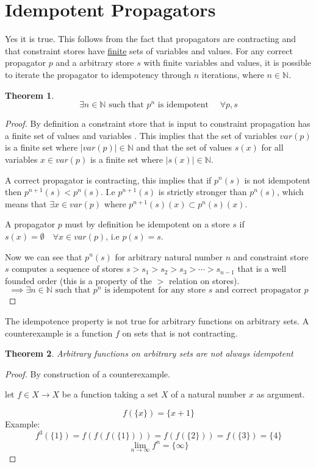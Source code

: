 \documentclass[a4paper, 11pt]{article}
\newtheorem{theorem}{Theorem}[section]
\begin{document}
\section*{Idempotent Propagators}
Yes it is true. This follows from the fact that propagators are contracting and that constraint stores have \underline{finite} sets of variables and values. For any correct propagator $p$ and a arbitrary store $s$ with finite variables and values, it is possible to iterate the propagator to idempotency through $n$ iterations, where $n \in \mathbb{N}$.

\begin{theorem}
  $$\exists n \in \mathbb{N} \text{ such that } p^n \text{ is idempotent } \quad \forall p,s$$
\end{theorem}
\begin{proof}
By definition a constraint store that is input to constraint propagation has a finite set of values and variables \citep{schulte_notes}. This implies that the set of variables $var(p)$ is a finite set where $|var(p)| \in \mathbb{N}$ and that the set of values $s(x)$ for all variables $x \in var(p)$ is a finite set where $|s(x)| \in \mathbb{N}$.

A correct propagator is contracting, this implies that if $p^n(s)$ is not idempotent then $p^{n+1}(s) < p^n(s)$. I.e $p^{n+1}(s)$ is strictly stronger than $p^n(s)$, which means that $\exists x \in var(p) \text{ where } p^{n+1}(s)(x) \subset p^{n}(s)(x)$.

A propagator $p$ must by definition be idempotent on a store $s$ if $s(x) = \emptyset \quad \forall x \in var(p)$, i.e $p(s) = s$.

Now we can see that $p^n(s)$ for arbitrary natural number $n$ and constraint store $s$ computes a sequence of stores $s > s_1 > s_2 > s_3 > \cdots > s_{n-1}$ that is a well founded order (this is a property of the $>$ relation on stores\citep{schulte_notes}).
  $$\implies \exists n \in \mathbb{N} \text{ such that } p^n \text{ is idempotent for any store } s \text{ and correct propagator }p$$
\end{proof}

The idempotence property is not true for arbitrary functions on arbitrary sets. A counterexample is a function $f$ on sets that is not contracting.

\begin{theorem}
Arbitrary functions on arbitrary sets are not always idempotent
\end{theorem}
\begin{proof}
By construction of a counterexample.

let $f \in X \rightarrow X$ be a function taking a set $X$ of a natural number $x$ as argument.

$$f(\{x\}) = \{x+1\}$$
Example:
$$f^3(\{1\}) = f(f(f(\{1\}))) = f(f(\{2\})) = f(\{3\}) = \{4\}$$
$$\lim_{n\to\infty} f^n = \{\infty\}$$
\end{proof}

{}

\end{document}

